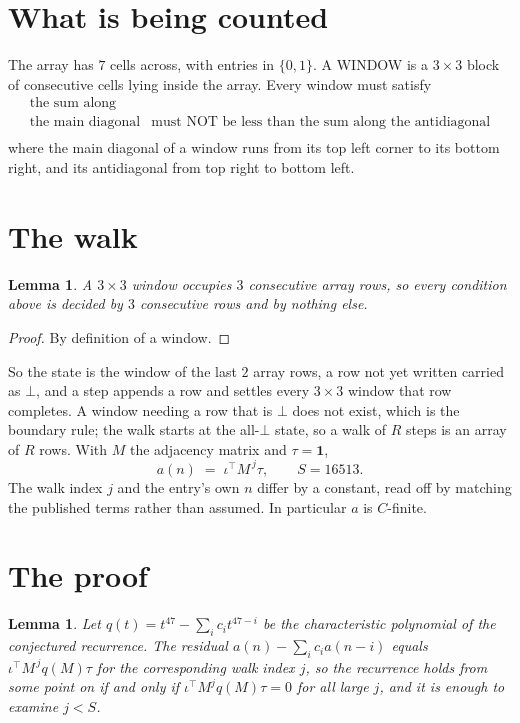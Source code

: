 \documentclass[11pt,a4paper]{article}
\theoremstyle{plain}
\newtheorem{lemma}[theorem]{Lemma}
\theoremstyle{definition}
\begin{document}
\section{What is being counted}

The array has $7$ cells across, with entries in $\{0,1\}$. A WINDOW is a $3\times3$ block
of consecutive cells lying inside the array. Every window must satisfy
\[
\begin{array}{ll}
\text{the sum along} & \text{} \\[2pt]
\text{the main diagonal} & \text{must NOT be less than the sum along the antidiagonal} \\
\end{array}
\]
where the main diagonal of a window runs from its top left corner to its bottom right, and its
antidiagonal from top right to bottom left.

\section{The walk}

\begin{lemma}\label{lem:win}
A $3\times3$ window occupies $3$ consecutive array rows, so every condition above is
decided by $3$ consecutive rows and by nothing else.
\end{lemma}

\begin{proof}
By definition of a window.
\end{proof}

So the state is the window of the last $2$ array rows, a row not yet written carried as
$\bot$, and a step appends a row and settles every $3\times3$ window that row completes. A
window needing a row that is $\bot$ does not exist, which is the boundary rule; the walk starts
at the all-$\bot$ state, so a walk of $R$ steps is an array of $R$ rows. With $M$ the adjacency
matrix and $\tau=\mathbf{1}$,
\[
a(n)\;=\;\iota^{\!\top}M^{\,j}\tau ,\qquad S=16513.
\]
The walk index $j$ and the entry's own $n$ differ by a constant, read off by matching the
published terms rather than assumed. In particular $a$ is $C$-finite.

\section{The proof}

\begin{lemma}\label{lem:crit}
Let $q(t)=t^{47}-\sum_i c_it^{47-i}$ be the characteristic polynomial of the
conjectured recurrence. The residual $a(n)-\sum_ic_ia(n-i)$ equals
$\iota^{\!\top}M^{\,j}q(M)\tau$ for the corresponding walk index $j$, so the recurrence
holds from some point on if and only if $\iota^{\!\top}M^{j}q(M)\tau=0$ for all large $j$,
and it is enough to examine $j<S$.
\end{lemma}
\end{document}
